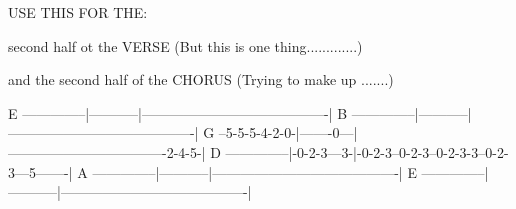 USE THIS FOR THE:

second half ot the VERSE (But this is one thing.............)

and the second half of the CHORUS (Trying to make up .......)


E --------------|-----------|----------------------------------------|
B --------------|-----------|----------------------------------------|
G --5-5-5-4-2-0-|-------0---|----------------------------------2-4-5-|
D --------------|-0-2-3---3-|-0-2-3--0-2-3--0-2-3-3--0-2-3---5-------|
A --------------|-----------|----------------------------------------|
E --------------|-----------|----------------------------------------|



